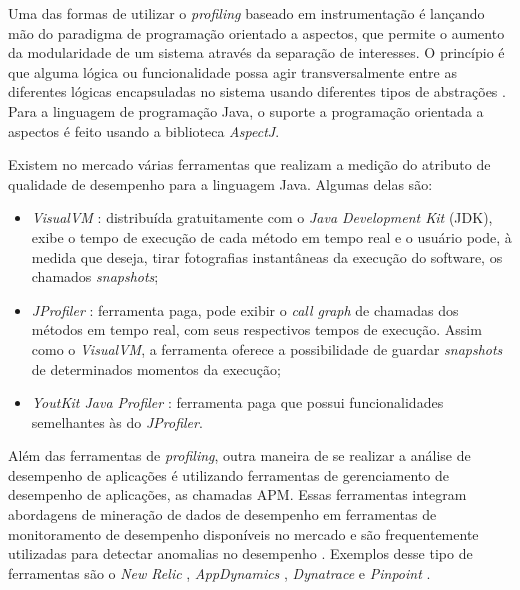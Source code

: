Uma das formas de utilizar o \textit{profiling} baseado em instrumentação é lançando mão do paradigma de programação orientado a aspectos, que permite o aumento da modularidade de um sistema através da separação de interesses. O princípio é que alguma lógica ou funcionalidade possa agir transversalmente entre as diferentes lógicas encapsuladas no sistema usando diferentes tipos de abstrações \cite{Bateman2009}. Para a linguagem de programação Java, o suporte a programação orientada a aspectos é feito usando a biblioteca \textit{AspectJ}.

Existem no mercado várias ferramentas que realizam a medição do atributo de qualidade de desempenho para a linguagem Java. Algumas delas são:
\begin{itemize}
	\item \textit{VisualVM} \cite{Vis}: distribuída gratuitamente com o \textit{Java Development Kit} (JDK), exibe o tempo de execução de cada método em tempo real e o usuário pode, à medida que deseja, tirar fotografias instantâneas da execução do software, os chamados \textit{snapshots};
	\item \textit{JProfiler} \cite{JProfiler}: ferramenta paga, pode exibir o \textit{call graph} de chamadas dos métodos em tempo real, com seus respectivos tempos de execução. Assim como o \textit{VisualVM}, a ferramenta oferece a possibilidade de guardar \textit{snapshots} de determinados momentos da execução;
	\item \textit{YoutKit Java Profiler} \cite{Profiler2016}: ferramenta paga que possui funcionalidades semelhantes às do \textit{JProfiler}.
\end{itemize}

Além das ferramentas de \textit{profiling}, outra maneira de se realizar a análise de desempenho de aplicações é utilizando ferramentas de gerenciamento de desempenho de aplicações, as chamadas APM. Essas ferramentas integram abordagens de mineração de dados de desempenho em ferramentas de monitoramento de desempenho disponíveis no mercado e são frequentemente utilizadas para detectar anomalias no desempenho \cite{Ahmed2016}. Exemplos desse tipo de ferramentas são o \textit{New Relic} \cite{Relic2016}, \textit{AppDynamics} \cite{Appdynamics}, \textit{Dynatrace} \cite{Dynatrace2016} e \textit{Pinpoint} \cite{Pinpoint2016}.

\section{\perfMinerName} \label{sec:perfminer}

